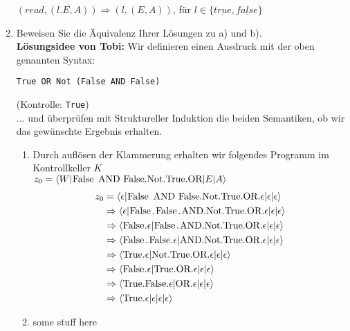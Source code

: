 \documentclass[ngerman,a4paper]{report}
\begin{document}
\begin{enumerate}
$(read,(l.E,A)) \Rightarrow (l,(E,A))$, für $l\in\{\underline{true},\underline{false}\}$\\
\item Beweisen Sie die Äquivalenz Ihrer Lösungen zu a) und b).\\
\textbf{Lösungsidee von Tobi:}
Wir definieren einen Ausdruck mit der oben genannten Syntax:
\begin{lstlisting}
True OR Not (False AND False)
\end{lstlisting}
(Kontrolle: \lstinline!True!)\\
... und überprüfen mit Struktureller Induktion die beiden Semantiken, ob wir das gewünschte Ergebnis erhalten.
\begin{enumerate}
\item Durch auflösen der Klammerung erhalten wir folgendes Programm im Kontrollkeller $K$\\
$z_0=\langle W|\text{\lstinline!False AND False.Not.True.OR!}|E|A\rangle$
\begin{align*}
z_0&=\langle \epsilon|\text{\lstinline!False AND False.Not.True.OR!}.\epsilon|\epsilon|\epsilon\rangle \\
&\Rightarrow \langle \epsilon|\text{\lstinline!False.False.AND.Not.True.OR!}.\epsilon|\epsilon|\epsilon\rangle\\
&\Rightarrow \langle \text{\lstinline!False!}.\epsilon|\text{\lstinline!False.AND.Not.True.OR!}.\epsilon|\epsilon|\epsilon\rangle\\
&\Rightarrow \langle \text{\lstinline!False.False!}.\epsilon|\text{\lstinline!AND.Not.True.OR!}.\epsilon|\epsilon|\epsilon\rangle\\
&\Rightarrow \langle \text{\lstinline!True!}.\epsilon|\text{\lstinline!Not.True.OR!}.\epsilon|\epsilon|\epsilon\rangle\\
&\Rightarrow \langle \text{\lstinline!False!}.\epsilon|\text{\lstinline!True.OR!}.\epsilon|\epsilon|\epsilon\rangle\\
&\Rightarrow \langle \text{\lstinline!True.False!}.\epsilon|\text{\lstinline!OR!}.\epsilon|\epsilon|\epsilon\rangle\\
&\Rightarrow \langle \text{\lstinline!True!}.\epsilon|\epsilon|\epsilon|\epsilon\rangle\\
\end{align*}
\item some stuff here\\
\end{enumerate}
\end{enumerate}
\end{document}
